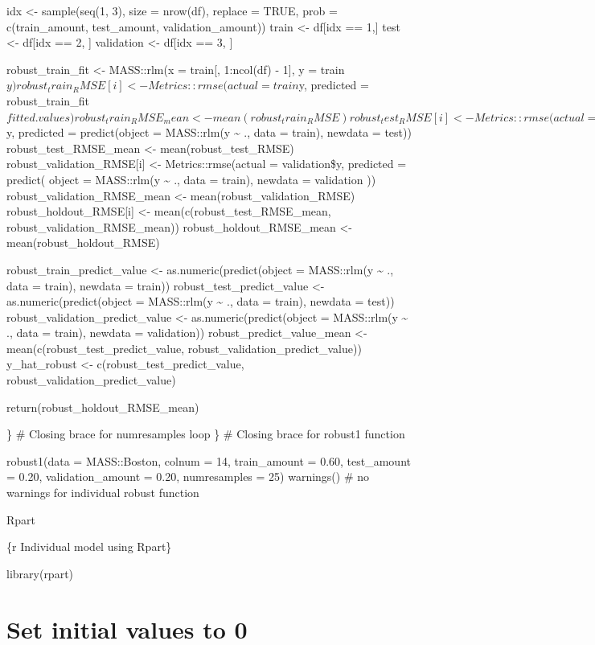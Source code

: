 \documentclass[
]{book}
\begin{document}
idx \textless- sample(seq(1, 3), size = nrow(df), replace = TRUE, prob =
c(train\_amount, test\_amount, validation\_amount)) train \textless- df{[}idx == 1,{]} test \textless- df{[}idx == 2, {]} validation \textless- df{[}idx == 3, {]}

robust\_train\_fit \textless- MASS::rlm(x = train{[}, 1:ncol(df) - 1{]}, y = train\(y)
robust_train_RMSE[i] <- Metrics::rmse(actual = train\)y, predicted =
robust\_train\_fit\(fitted.values)
robust_train_RMSE_mean <- mean(robust_train_RMSE)
robust_test_RMSE[i] <- Metrics::rmse(actual = test\)y, predicted =
predict(object = MASS::rlm(y \textasciitilde{} ., data = train), newdata = test))
robust\_test\_RMSE\_mean \textless- mean(robust\_test\_RMSE)
robust\_validation\_RMSE{[}i{]} \textless- Metrics::rmse(actual = validation\$y,
predicted = predict( object = MASS::rlm(y \textasciitilde{} ., data = train), newdata =
validation )) robust\_validation\_RMSE\_mean \textless-
mean(robust\_validation\_RMSE) robust\_holdout\_RMSE{[}i{]} \textless-
mean(c(robust\_test\_RMSE\_mean, robust\_validation\_RMSE\_mean))
robust\_holdout\_RMSE\_mean \textless- mean(robust\_holdout\_RMSE)

robust\_train\_predict\_value \textless- as.numeric(predict(object = MASS::rlm(y
\textasciitilde{} ., data = train), newdata = train)) robust\_test\_predict\_value \textless-
as.numeric(predict(object = MASS::rlm(y \textasciitilde{} ., data = train), newdata =
test)) robust\_validation\_predict\_value \textless- as.numeric(predict(object =
MASS::rlm(y \textasciitilde{} ., data = train), newdata = validation))
robust\_predict\_value\_mean \textless- mean(c(robust\_test\_predict\_value,
robust\_validation\_predict\_value)) y\_hat\_robust \textless-
c(robust\_test\_predict\_value, robust\_validation\_predict\_value)

return(robust\_holdout\_RMSE\_mean)

\} \# Closing brace for numresamples loop \} \# Closing brace for robust1
function

robust1(data = MASS::Boston, colnum = 14, train\_amount = 0.60,
test\_amount = 0.20, validation\_amount = 0.20, numresamples = 25)
warnings() \# no warnings for individual robust function

Rpart

\{r Individual model using Rpart\}

library(rpart)

\chapter{Set initial values to 0}\label{set-initial-values-to-0-17}
\end{document}
